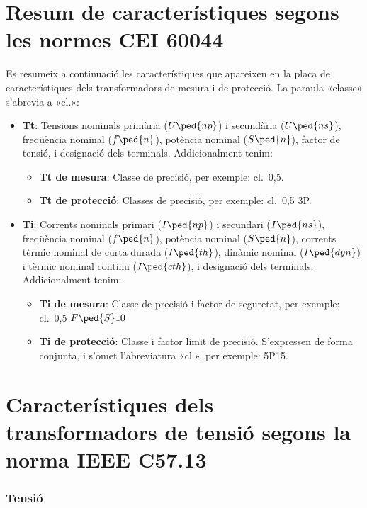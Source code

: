 \section{Resum de característiques segons les normes CEI 60044}

Es resumeix a continuació les característiques que apareixen en la placa de característiques dels transformadors de mesura i de protecció. La paraula
«classe» s'abrevia a «cl.»:

\begin{itemize}
   \item \textbf{Tt}: Tensions nominals  primària ($U\ped{np}$) i secundària ($U\ped{ns}$), freqüència nominal ($f\ped{n}$),
    potència nominal ($S\ped{n}$), factor de tensió, i     designació dels terminals. Addicionalment tenim:
       \begin{itemize}
           \item \textbf{Tt de mesura}: Classe de precisió, per  exemple: cl.~0,5.
           \item \textbf{Tt de protecció}: Classes de precisió, per  exemple: cl.~0,5 3P.
        \end{itemize}
    \item \textbf{Ti}: Corrents nominals primari ($I\ped{np}$) i secundari ($I\ped{ns}$), freqüència nominal ($f\ped{n}$),
     potència nominal ($S\ped{n}$),  corrents tèrmic nominal de curta durada ($I\ped{th}$), dinàmic nominal ($I\ped{dyn}$) i tèrmic nominal continu ($I\ped{cth}$), i     designació dels terminals. Addicionalment tenim:
        \begin{itemize}
           \item \textbf{Ti de mesura}: Classe de precisió i factor de seguretat, per exemple: cl.~0,5 $F\ped{S} 10$
           \item \textbf{Ti de protecció}: Classe i factor límit de precisió. S'expressen de forma conjunta, i s'omet l'abreviatura «cl.»,  per exemple: 5P15.
        \end{itemize}
\end{itemize}


\section{Característiques dels transformadors de tensió segons la norma IEEE C57.13}

\subsubsection{Tensió}

